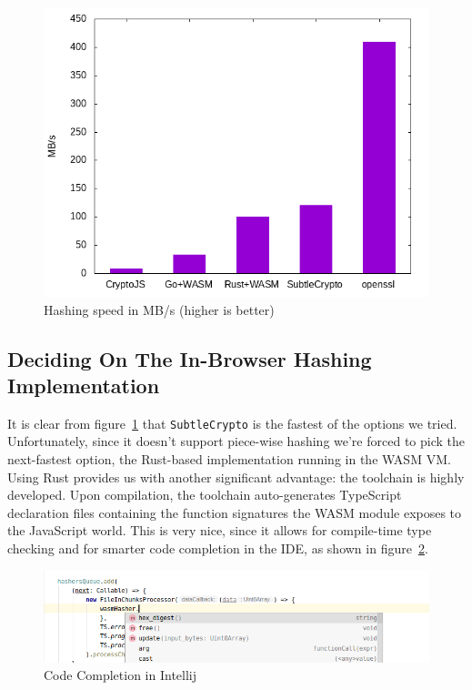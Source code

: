 \begin{figure}
    \begin{center}
        \includegraphics[width=0.7\linewidth]{images/hashingperformance.png}
        \caption{Hashing speed in MB/s (higher is better)}
        \label{fig:hashingperformance}
    \end{center}
\end{figure}


\subsection{Deciding On The In-Browser Hashing Implementation}
\label{subsec:deciding-on-the-in-browser-hashing-implementation}
It is clear from figure~\ref{fig:hashingperformance} that \texttt{SubtleCrypto} is the fastest of the options we tried.
Unfortunately, since it doesn't support piece-wise hashing we're forced to pick the next-fastest option,
the Rust-based implementation running in the \gls{WASM} \gls{VM}.
Using Rust provides us with another significant advantage:
the toolchain is highly developed.
Upon compilation, the toolchain auto-generates TypeScript declaration files containing the function signatures
the \gls{WASM} module exposes to the JavaScript world.
This is very nice, since it allows for compile-time type checking and for smarter code completion in the \gls{IDE},
as shown in figure~\ref{fig:dtside}.

\begin{figure}
    \begin{center}
        \includegraphics[width=0.7\linewidth]{images/dtside.png}
        \caption{Code Completion in Intellij}
        \label{fig:dtside}
    \end{center}
\end{figure}


